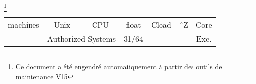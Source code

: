 
\pagestyle{myheadings}

\Begin
{}

\begin{center}

\footnote{Ce document a \'{e}t\'{e} engendr\'{e} automatiquement \`{a} partir
des outils de maintenance V15}

\begin{tabular}{|c||c|c||c|c|c|c|} \hline 
machines &    Unix  &   CPU        & float & Cload & \^\ Z & Core \\ \cline{2-3}
 &  \multicolumn{2}{|c||}{Authorized Systems} & 31/64 &       &     & Exe.  \\
\hline \hline \hline


\end{tabular}
\end{center}

